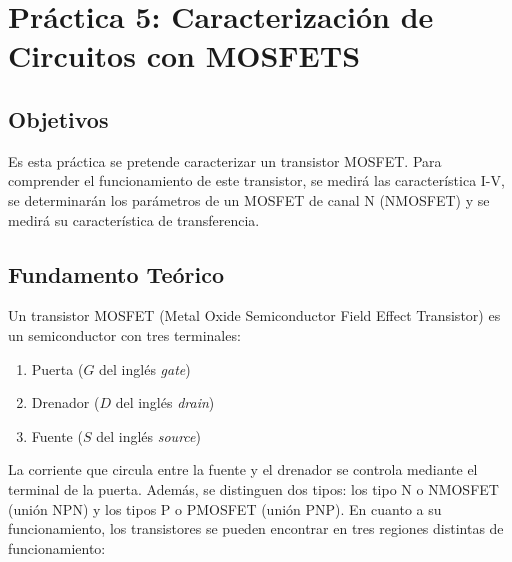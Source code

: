 \chapter{Práctica 5: Caracterización de Circuitos con MOSFETS}

\section{Objetivos}
Es esta práctica se pretende caracterizar un transistor MOSFET. Para comprender el funcionamiento de este transistor, se medirá las característica I-V, se determinarán los parámetros de un MOSFET de canal N (NMOSFET) y se medirá su característica de transferencia.

\section{Fundamento Teórico}
Un transistor MOSFET (Metal Oxide Semiconductor Field Effect Transistor) es un semiconductor con tres terminales:
\begin{enumerate}
    \item Puerta ($G$ del inglés \emph{gate})
    \item Drenador ($D$ del inglés \emph{drain})
    \item Fuente ($S$ del inglés \emph{source})
\end{enumerate}
La corriente que circula entre la fuente y el drenador se controla mediante el terminal de la puerta. Además, se distinguen dos tipos: los tipo N o NMOSFET (unión NPN) y los tipos P o PMOSFET (unión PNP). En cuanto a su funcionamiento, los transistores se pueden encontrar en tres regiones distintas de funcionamiento:
